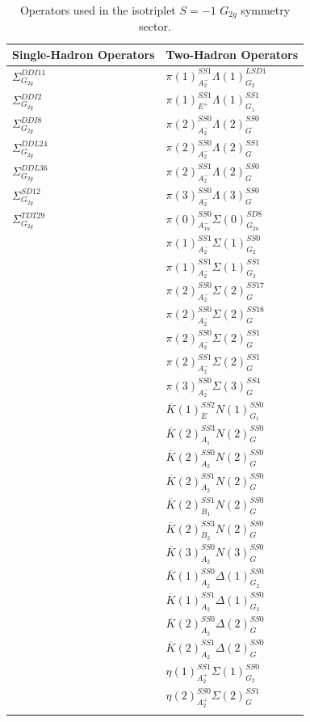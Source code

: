 \begin{longtable}{l|l}
    \textbf{Single-Hadron Operators} & \textbf{Two-Hadron Operators} \\
    \hline
    $\Sigma_{G_{2g}}^{DDI11}$ & $\pi(1)_{A_2^-}^{SS1}\Lambda(1)_{G_2}^{LSD1}$\\
    $\Sigma_{G_{2g}}^{DDI2}$ & $\pi(1)_{E^+}^{SS1}\Lambda(1)_{G_1}^{SS1}$\\
    $\Sigma_{G_{2g}}^{DDI8}$ & $\pi(2)_{A_2^-}^{SS0}\Lambda(2)_{G}^{SS0}$\\
    $\Sigma_{G_{2g}}^{DDL24}$ & $\pi(2)_{A_2^-}^{SS0}\Lambda(2)_{G}^{SS1}$\\
    $\Sigma_{G_{2g}}^{DDL36}$ & $\pi(2)_{A_2^-}^{SS1}\Lambda(2)_{G}^{SS0}$\\
    $\Sigma_{G_{2g}}^{SD12}$ & $\pi(3)_{A_2^-}^{SS0}\Lambda(3)_{G}^{SS0}$\\
    $\Sigma_{G_{2g}}^{TDT29}$ & $\pi(0)_{A_{1u}^-}^{SS0}\Sigma(0)_{G_{2u}}^{SD8}$\\
    & $\pi(1)_{A_2^-}^{SS1}\Sigma(1)_{G_2}^{SS0}$\\
    & $\pi(1)_{A_2^-}^{SS1}\Sigma(1)_{G_2}^{SS1}$\\
    & $\pi(2)_{A_2^-}^{SS0}\Sigma(2)_{G}^{SS17}$\\
    & $\pi(2)_{A_2^-}^{SS0}\Sigma(2)_{G}^{SS18}$\\
    & $\pi(2)_{A_2^-}^{SS0}\Sigma(2)_{G}^{SS1}$\\
    & $\pi(2)_{A_2^-}^{SS1}\Sigma(2)_{G}^{SS1}$\\
    & $\pi(3)_{A_2^-}^{SS0}\Sigma(3)_{G}^{SS4}$\\
    & $\overline K(1)_{E}^{SS2}N(1)_{G_1}^{SS0}$\\
    & $\overline K(2)_{A_1}^{SS3}N(2)_{G}^{SS0}$\\
    & $\overline K(2)_{A_2}^{SS0}N(2)_{G}^{SS0}$\\
    & $\overline K(2)_{A_2}^{SS1}N(2)_{G}^{SS0}$\\
    & $\overline K(2)_{B_1}^{SS1}N(2)_{G}^{SS0}$\\
    & $\overline K(2)_{B_2}^{SS3}N(2)_{G}^{SS0}$\\
    & $\overline K(3)_{A_2}^{SS0}N(3)_{G}^{SS0}$\\
    & $\overline K(1)_{A_2}^{SS0}\Delta(1)_{G_2}^{SS0}$\\
    & $\overline K(1)_{A_2}^{SS1}\Delta(1)_{G_2}^{SS0}$\\
    & $\overline K(2)_{A_2}^{SS0}\Delta(2)_{G}^{SS0}$\\
    & $\overline K(2)_{A_2}^{SS1}\Delta(2)_{G}^{SS0}$\\
    & $\eta(1)_{A_2^+}^{SS1}\Sigma(1)_{G_2}^{SS0}$\\
    & $\eta(2)_{A_2^+}^{SS0}\Sigma(2)_{G}^{SS1}$\\
    \caption{Operators used in the isotriplet $S=-1$ $G_{2g}$ symmetry sector.}\label{table:g2g_ops}
\end{longtable}

